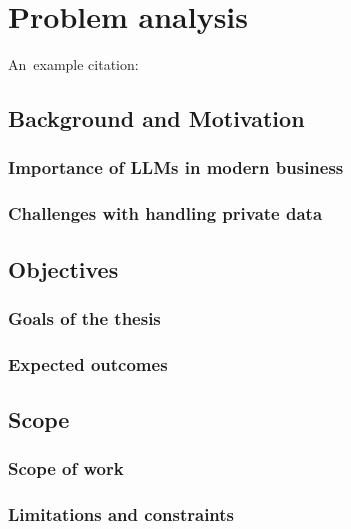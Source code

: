 \chapter{Problem analysis}

An~example citation: \cite{Andel07}

\section{Background and Motivation}
\subsection{Importance of LLMs in modern business}
\subsection{Challenges with handling private data}

\section{Objectives}
\subsection{Goals of the thesis}
\subsection{Expected outcomes}

\section{Scope}
\subsection{Scope of work}
\subsection{Limitations and constraints}
